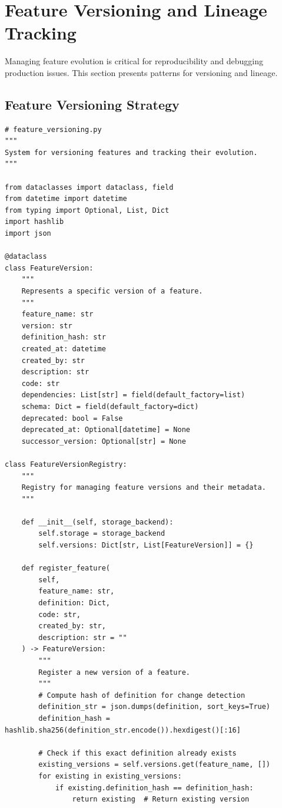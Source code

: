 \section{Feature Versioning and Lineage Tracking}

Managing feature evolution is critical for reproducibility and debugging production issues. This section presents patterns for versioning and lineage.

\subsection{Feature Versioning Strategy}

\begin{lstlisting}[style=python, caption=Feature versioning and registry management]
# feature_versioning.py
"""
System for versioning features and tracking their evolution.
"""

from dataclasses import dataclass, field
from datetime import datetime
from typing import Optional, List, Dict
import hashlib
import json

@dataclass
class FeatureVersion:
    """
    Represents a specific version of a feature.
    """
    feature_name: str
    version: str
    definition_hash: str
    created_at: datetime
    created_by: str
    description: str
    code: str
    dependencies: List[str] = field(default_factory=list)
    schema: Dict = field(default_factory=dict)
    deprecated: bool = False
    deprecated_at: Optional[datetime] = None
    successor_version: Optional[str] = None

class FeatureVersionRegistry:
    """
    Registry for managing feature versions and their metadata.
    """

    def __init__(self, storage_backend):
        self.storage = storage_backend
        self.versions: Dict[str, List[FeatureVersion]] = {}

    def register_feature(
        self,
        feature_name: str,
        definition: Dict,
        code: str,
        created_by: str,
        description: str = ""
    ) -> FeatureVersion:
        """
        Register a new version of a feature.
        """
        # Compute hash of definition for change detection
        definition_str = json.dumps(definition, sort_keys=True)
        definition_hash = hashlib.sha256(definition_str.encode()).hexdigest()[:16]

        # Check if this exact definition already exists
        existing_versions = self.versions.get(feature_name, [])
        for existing in existing_versions:
            if existing.definition_hash == definition_hash:
                return existing  # Return existing version


\end{lstlisting}
